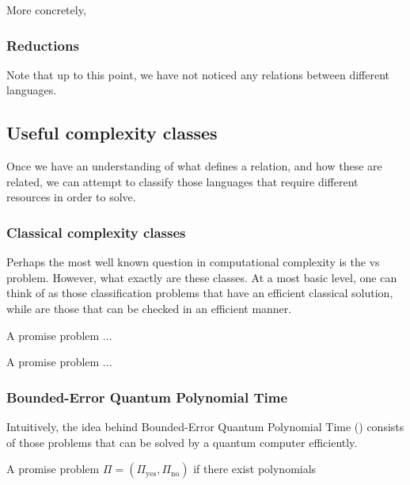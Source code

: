 \documentclass[../thesis-main/thesis-main]{subfiles}
\begin{document}
More concretely, 


\subsubsection{Reductions}

Note that up to this point, we have not noticed any relations between different languages.  

\subsection{Useful complexity classes}

Once we have an understanding of what defines a relation, and how these are related, we can attempt to classify those languages that require different resources in order to solve.

\subsubsection{Classical complexity classes}

  Perhaps the most well known question in computational complexity is the \PP vs \NP problem.  However, what exactly are these classes.  At a most basic level, one can think of \PP as those classification problems that have an efficient classical solution, while \NP are those that can be checked in an efficient manner.  


\begin{definition}[\PP]
  A promise problem ...
\end{definition}

\begin{definition}[\NP]
  A promise problem ...
\end{definition}

\subsubsection{Bounded-Error Quantum Polynomial Time}

Intuitively, the idea behind Bounded-Error Quantum Polynomial Time (\BQP) consists of those problems that can be solved by a quantum computer efficiently.


\begin{definition}[\BQP] A promise problem $\Pi = (\Pi_{\text{yes}},\Pi_{\text{no}})$ if there exist polynomials 
\end{definition}
\end{document}
